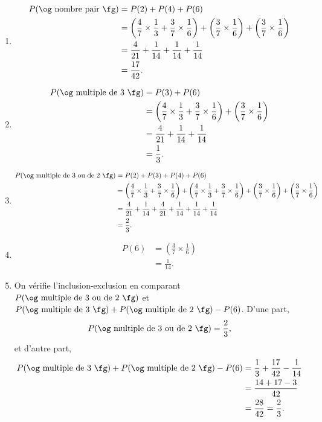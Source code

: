 {	\begin{enumerate}
		\item
			\begin{align*}
				P(\text{\og nombre pair \fg}) &= P(2) + P(4) + P(6) \\
					&= \left( \frac47 \times \frac13 + \frac37\times\frac16 \right) + \left( \frac37 \times \frac16 \right) + \left( \frac37 \times \frac16 \right) \\
					&= \frac4{21} + \frac1{14} + \frac1{14} + \frac1{14} \\
					&= \frac{17}{42}.
			\end{align*}
		\item
			\begin{align*}
				P(\text{\og multiple de $3$ \fg}) &= P(3) + P(6) \\
					&= \left( \frac47 \times \frac13 + \frac37\times\frac16 \right) + \left( \frac37 \times \frac16 \right) \\
					&= \frac4{21} + \frac1{14} + \frac1{14} \\
					&= \frac13.
			\end{align*}
		\item
			\begin{align*}
				P(\text{\og multiple de $3$ ou de $2$ \fg}) &= P(2) + P(3) + P(4) + P(6) \\
					&= \left( \frac47 \times \frac13 + \frac37\times\frac16 \right) + \left( \frac47 \times \frac13 + \frac37\times\frac16 \right) + \left( \frac37 \times \frac16 \right) + \left( \frac37 \times \frac16 \right) \\
					&= \frac4{21} + \frac1{14} + \frac4{21} + \frac1{14} + \frac1{14} + \frac1{14} \\
					&= \frac23.
			\end{align*}
		\item 
			\begin{align*}
				P(6) &=\left( \frac37 \times \frac16 \right) \\
					&= \frac1{14}.
			\end{align*}
		
		\item
		On vérifie l'inclusion-exclusion en comparant $P(\text{\og multiple de $3$ ou de $2$ \fg})$ et $P(\text{\og multiple de $3$ \fg}) + P(\text{\og multiple de $2$ \fg}) - P(6)$.
		D'une part,
			\[ P(\text{\og multiple de $3$ ou de $2$ \fg}) = \frac23, \]
		et d'autre part,
			\begin{align*}
				P(\text{\og multiple de $3$ \fg}) + P(\text{\og multiple de $2$ \fg}) - P(6) &= \frac13 + \frac{17}{42} - \frac1{14} \\
				&= \frac{14 + 17 - 3}{42} \\
				&= \frac{28}{42} = \frac23.
			\end{align*}
	\end{enumerate}
}



